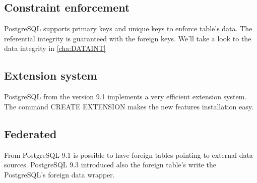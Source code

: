 \subsection{Constraint enforcement}
PostgreSQL supports primary keys and unique keys to enforce table's data. The referential integrity 
is guaranteed with the foreign keys. We'll take a look to the data integrity in \ref{cha:DATAINT}

\subsection{Extension system}
PostgreSQL from the version 9.1 implements a very efficient extension system. The command CREATE 
EXTENSION makes the new features installation easy.

\subsection{Federated}
From PostgreSQL 9.1 is possible to have foreign tables pointing to external data sources. 
PostgreSQL 9.3 introduced also the foreign table's write the PostgreSQL's foreign data 
wrapper.
